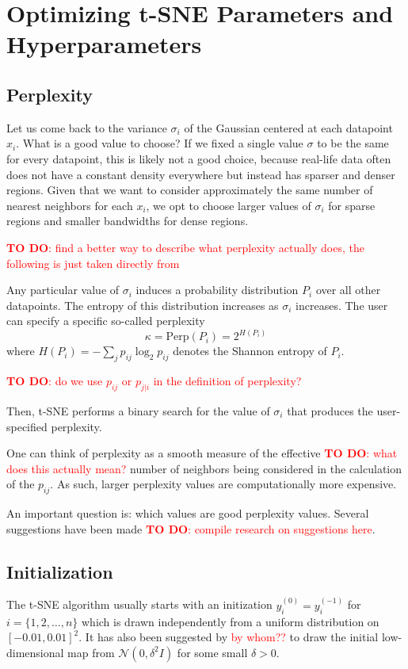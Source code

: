 \section{Optimizing t-SNE Parameters and Hyperparameters}

\subsection{Perplexity}
Let us come back to the variance $\sigma_i$ of the Gaussian centered at each datapoint $x_i$. What is a good value to choose? 
If we fixed a single value $\sigma$ to be the same for every datapoint, this is likely not a good choice, because real-life data often does not have a constant density everywhere but instead has sparser and denser regions. 
Given that we want to consider approximately the same number of nearest neighbors for each $x_i$, we opt to choose larger values of $\sigma_i$ for sparse regions and smaller bandwidths for dense regions. 

\textcolor{red}{\textbf{TO DO}: find a better way to describe what perplexity actually does, the following is just taken directly from \cite{vdMaa08}}

Any particular value of $\sigma_i$ induces a probability distribution $P_i$ over all other datapoints. 
The entropy of this distribution increases as $\sigma_i$ increases. 
The user can specify a specific so-called perplexity
\begin{equation}
    \kappa = \text{Perp}(P_i) = 2^{H(P_i)} 
\end{equation}
where $H(P_i) = -\sum_{j} p_{ij} \log_2 p_{ij}$ denotes the Shannon entropy of $P_i$. 

\textcolor{red}{\textbf{TO DO}: do we use $p_{ij}$ or $p_{j|i}$ in the definition of perplexity?}

Then, t-SNE performs a binary search for the value of $\sigma_i$ that produces the user-specified perplexity. 

One can think of perplexity as a smooth measure of the effective \textcolor{red}{\textbf{TO DO}: what does this actually mean?} number of neighbors being considered in the calculation of the $p_{ij}$. As such, larger perplexity values are computationally more expensive. 

An important question is: which values are good perplexity values. Several suggestions have been made \textcolor{red}{\textbf{TO DO}: compile research on suggestions here}. 


\subsection{Initialization}
The t-SNE algorithm usually starts with an initization $y_i^{(0)} = y_i^{(-1)}$ for $i=\{1, 2, \dots, n\}$ which is drawn independently from a uniform distribution on $[-0.01, 0.01]^2$. It has also been suggested by \textcolor{red}{by whom??} to draw the initial low-dimensional map from $\mathcal{N}(0, \delta^2 I)$ for some small $\delta > 0$. 

